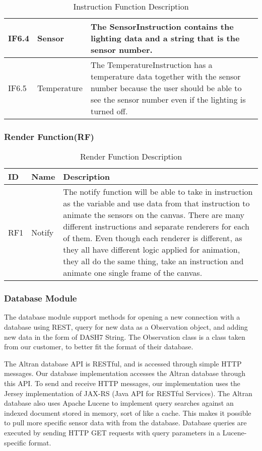 \documentclass[../document]{subfiles}
\begin{document}
\begin{table}[H]
\caption{Instruction Function Description}
\centering
\begin{tabularx}{\textwidth}{|l|l|X|}
	\hline
	IF6.4
	&Sensor
	&The SensorInstruction contains the lighting data and a string that is the sensor number.
	\\ \hline IF6.5
	&Temperature
	&The TemperatureInstruction has a temperature data together with the sensor number because the user should be able to see the sensor number even if the lighting is turned off.
	\\ \hline 
\end{tabularx}
\end{table}

\subsubsection{Render Function(RF)}
\begin{table}[H]
\caption{Render Function Description}
\centering
\begin{tabularx}{\textwidth}{|l|l|X|}
	\hline
	ID
	&Name
	&Description
	\\ \hline RF1
	&Notify
	&The notify function will be able to take in instruction as the variable and use data from that instruction to animate the sensors on the canvas. There are many different instructions and separate renderers for each of them. Even though each renderer is different, as they all have different logic applied for animation, they all do the same thing, take an instruction and animate one single frame of the canvas.
	\\ \hline 
\end{tabularx}
\end{table}

\subsubsection{Database Module}
The database module support methods for opening a new connection with a database using REST, query for new data as a Observation object, and adding new data in the form of DASH7 String. The Observation class is a class taken from our customer, to better fit the format of their database.

The Altran database API is RESTful, and is accessed through simple HTTP messages. Our database implementation accesses the Altran database through this API. To send and receive HTTP messages, our implementation uses the Jersey implementation of JAX-RS (Java API for RESTful Services). The Altran database also uses Apache Lucene to implement query searches against an indexed document stored in memory, sort of like a cache. This makes it possible to pull more specific sensor data with from the database. Database queries are executed by sending HTTP GET requests with query parameters in a Lucene-specific format.
\end{document}
